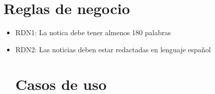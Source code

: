 \section{Reglas de negocio}
\begin{itemize}
\section{Estructura del Documento}
  \item RDN1: La notica debe tener almenos 180 palabras
  \item RDN2: Las noticias deben estar redactadas en lenguaje español


\newpage
\section{Casos de uso}


\newpage

\newpage

\newpage




\end{itemize}